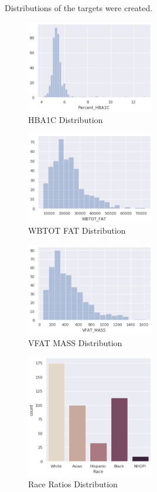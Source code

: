 Distributions of the targets were created.

\begin{figure}[h]
	\caption{HBA1C Distribution}
	\centering
	\includegraphics[width=0.5\textwidth]{images/hba1c.png}
\end{figure}

\begin{figure}[h]
	\caption{WBTOT FAT Distribution}
	\centering
	\includegraphics[width=0.5\textwidth]{images/wbtot_fat.png}
\end{figure}


\begin{figure}[h]
	\caption{VFAT MASS Distribution}
	\centering
	\includegraphics[width=0.5\textwidth]{images/vfat_mass.png}
\end{figure}

\begin{figure}[h]
	\caption{Race Ratios Distribution}
	\centering
	\includegraphics[width=0.5\textwidth]{images/race_ratios.png}
\end{figure}


